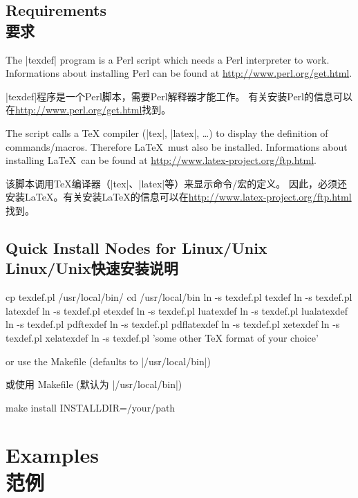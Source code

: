 \documentclass{article}
\begin{document}
\subsection*{Requirements\\要求}

The |texdef| program is a Perl script which needs a Perl interpreter to work.
Informations about installing Perl can be found at \url{http://www.perl.org/get.html}.

|texdef|程序是一个Perl脚本，需要Perl解释器才能工作。
有关安装Perl的信息可以在\url{http://www.perl.org/get.html}找到。

The script calls a TeX compiler (|tex|, |latex|, \ldots) to display the definition of commands/macros.
Therefore \LaTeX\ must also be installed.
Informations about installing \LaTeX\ can be found at \url{http://www.latex-project.org/ftp.html}.

该脚本调用TeX编译器（|tex|、|latex|等）来显示命令/宏的定义。
因此，必须还安装\LaTeX。有关安装\LaTeX 的信息可以在\url{http://www.latex-project.org/ftp.html}找到。


\subsection*{Quick Install Nodes for Linux/Unix\\Linux/Unix快速安装说明}

\begin{commandshell}
cp texdef.pl /usr/local/bin/
cd /usr/local/bin
ln -s texdef.pl texdef
ln -s texdef.pl latexdef
ln -s texdef.pl etexdef
ln -s texdef.pl luatexdef
ln -s texdef.pl lualatexdef
ln -s texdef.pl pdftexdef
ln -s texdef.pl pdflatexdef
ln -s texdef.pl xetexdef
ln -s texdef.pl xelatexdef
ln -s texdef.pl 'some other TeX format of your choice'
\end{commandshell}

\noindent or use the Makefile (defaults to |/usr/local/bin|)

\noindent 或使用 Makefile (默认为 |/usr/local/bin|)

\begin{commandshell}
make install INSTALLDIR=/your/path
\end{commandshell}

\section{Examples\\范例}
\end{document}
